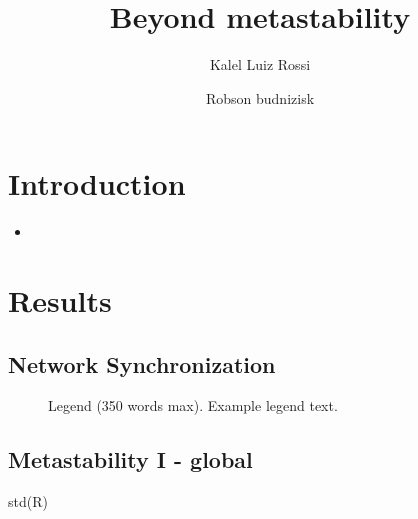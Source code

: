 \documentclass[fleqn,10pt]{wlscirep}
\title{Beyond metastability}
\author[1,*]{Kalel Luiz Rossi}
\author[2]{Robson budnizisk}
\affil[*]{corresponding.author@email.example}
\begin{document}
\flushbottom
\maketitle
%
%
\thispagestyle{empty}


\section*{Introduction}

\begin{itemize}
    \item 
\end{itemize}


\section*{Results}


\subsection*{Network Synchronization}

\begin{figure}[ht]
\centering
\caption{Legend (350 words max). Example legend text.}
\label{fig:stream}
\end{figure}

\subsection*{Metastability I - global }
std(R)
\end{document}
